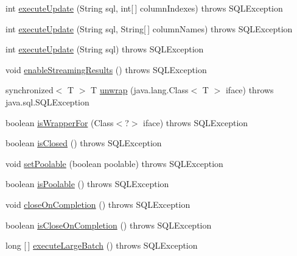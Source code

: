 \begin{DoxyCompactItemize}
\item 
int \mbox{\hyperlink{classcom_1_1mysql_1_1cj_1_1jdbc_1_1_statement_wrapper_a7fea6987db9c3689e11c0a25887e9c5c}{execute\+Update}} (String sql, int\mbox{[}$\,$\mbox{]} column\+Indexes)  throws S\+Q\+L\+Exception 
\item 
int \mbox{\hyperlink{classcom_1_1mysql_1_1cj_1_1jdbc_1_1_statement_wrapper_a3a7d7ad287230c2187c2cbef6e0ed583}{execute\+Update}} (String sql, String\mbox{[}$\,$\mbox{]} column\+Names)  throws S\+Q\+L\+Exception 
\item 
int \mbox{\hyperlink{classcom_1_1mysql_1_1cj_1_1jdbc_1_1_statement_wrapper_ae9f4d1e17c24a7d1310dab07615437d3}{execute\+Update}} (String sql)  throws S\+Q\+L\+Exception 
\item 
void \mbox{\hyperlink{classcom_1_1mysql_1_1cj_1_1jdbc_1_1_statement_wrapper_ae7419c70c8518031ba3131cc6e22253d}{enable\+Streaming\+Results}} ()  throws S\+Q\+L\+Exception 
\item 
synchronized$<$ T $>$ T \mbox{\hyperlink{classcom_1_1mysql_1_1cj_1_1jdbc_1_1_statement_wrapper_ab5729968dd5a079a6fabb69c3e1dde40}{unwrap}} (java.\+lang.\+Class$<$ T $>$ iface)  throws java.\+sql.\+S\+Q\+L\+Exception 
\item 
boolean \mbox{\hyperlink{classcom_1_1mysql_1_1cj_1_1jdbc_1_1_statement_wrapper_ac909b23a76074610336931e26f634d2d}{is\+Wrapper\+For}} (Class$<$?$>$ iface)  throws S\+Q\+L\+Exception 
\item 
boolean \mbox{\hyperlink{classcom_1_1mysql_1_1cj_1_1jdbc_1_1_statement_wrapper_a8accb59a362a26143c028245bea8c7ff}{is\+Closed}} ()  throws S\+Q\+L\+Exception 
\item 
void \mbox{\hyperlink{classcom_1_1mysql_1_1cj_1_1jdbc_1_1_statement_wrapper_a5b9788a62e25c619e0af80c81ab4d570}{set\+Poolable}} (boolean poolable)  throws S\+Q\+L\+Exception 
\item 
boolean \mbox{\hyperlink{classcom_1_1mysql_1_1cj_1_1jdbc_1_1_statement_wrapper_a653108d32ffc4a2809198e379ede7c9a}{is\+Poolable}} ()  throws S\+Q\+L\+Exception 
\item 
void \mbox{\hyperlink{classcom_1_1mysql_1_1cj_1_1jdbc_1_1_statement_wrapper_a02e89b78190945fc4ce29b8a2dbf4c9f}{close\+On\+Completion}} ()  throws S\+Q\+L\+Exception 
\item 
boolean \mbox{\hyperlink{classcom_1_1mysql_1_1cj_1_1jdbc_1_1_statement_wrapper_a67038f116aab09401c6001bcded6fded}{is\+Close\+On\+Completion}} ()  throws S\+Q\+L\+Exception 
\item 
long \mbox{[}$\,$\mbox{]} \mbox{\hyperlink{classcom_1_1mysql_1_1cj_1_1jdbc_1_1_statement_wrapper_a1d380811bb181cb0d92ca408d29aa3a0}{execute\+Large\+Batch}} ()  throws S\+Q\+L\+Exception 

\end{DoxyCompactItemize}
